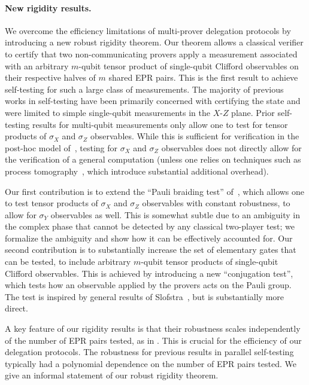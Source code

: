 \documentclass[11pt]{article}
\begin{document}
\paragraph{New rigidity results.} We overcome the efficiency limitations of
multi-prover delegation protocols by introducing a new robust rigidity theorem. Our theorem allows a classical verifier to certify that two non-communicating provers apply a measurement associated with an arbitrary $m$-qubit tensor product of single-qubit Clifford observables on their respective halves of $m$ shared EPR pairs.
This is the first result to achieve self-testing for such a large class of
measurements. The majority of previous works in self-testing have been primarily
concerned with certifying the state and were limited to simple single-qubit
measurements in the $X$-$Z$ plane. Prior self-testing results for multi-qubit
measurements only allow one to test for tensor products of $\sigma_X$ and $\sigma_Z$
observables. While this is sufficient for verification in the post-hoc model
of~\cite{hajdusek2015posthoc}, testing for $\sigma_X$ and $\sigma_Z$ observables
does not directly allow for the verification of a general computation (unless
one relies on techniques such as process
tomography~\cite{reichardt2012classical}, which introduce substantial additional
overhead).  

Our first contribution is to extend the ``Pauli braiding test'' of~\cite{natarajan2016robust}, which allows one to test tensor products of $\sigma_X$ and $\sigma_Z$ observables with constant robustness, to allow for $\sigma_Y$ observables as well. This is somewhat subtle due to an ambiguity in the complex phase that cannot be detected by any classical two-player test; we formalize the ambiguity and show how it can be effectively accounted for. Our second contribution is to substantially increase the set of elementary gates that can be tested, to include arbitrary $m$-qubit tensor products of single-qubit Clifford observables. This is achieved by introducing a new ``conjugation test'', which tests how an observable applied by the provers acts on the Pauli group. The test is inspired by general results of Slofstra~\cite{slofstra2016tsirelson}, but is substantially more direct. 

 A key feature of our rigidity results is that their robustness scales independently of the number of EPR pairs tested, as in \cite{natarajan2016robust}. This is crucial for the efficiency of our delegation protocols. The robustness for previous results in parallel self-testing typically had a polynomial dependence on the number of EPR pairs tested. We give an informal statement of our robust rigidity theorem.
 
\end{document}
